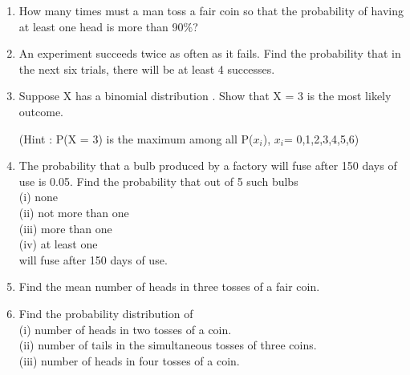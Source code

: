 
\renewcommand{\theequation}{\theenumi}
\begin{enumerate}[label=\thesection.\arabic*.,ref=\thesection.\theenumi]


\item How many times must a man toss a fair coin so that the probability of having at least one head is more than 90$\%$?\\
\item An experiment succeeds twice as often as it fails. Find the probability that in the next six trials, there will be at least 4 successes.\\
\solution


\item Suppose X has a binomial distribution . Show that X = 3 is the most likely outcome.\\
\solution

(Hint : P(X = 3) is the maximum among all P($x_i$), $x_i$= 0,1,2,3,4,5,6)\\
\item The probability that a bulb produced by a factory will fuse after 150 days of use
is 0.05. Find the probability that out of 5 such bulbs\\
(i) none\\
(ii) not more than one\\
(iii) more than one\\
(iv) at least one\\
will fuse after 150 days of use.\\
\solution


\item Find the mean number of heads in three tosses of a fair coin.\\
\solution


\item Find the probability distribution of\\
(i) number of heads in two tosses of a coin.\\
(ii) number of tails in the simultaneous tosses of three coins.\\
(iii) number of heads in four tosses of a coin.\\
\solution



\end{enumerate}
